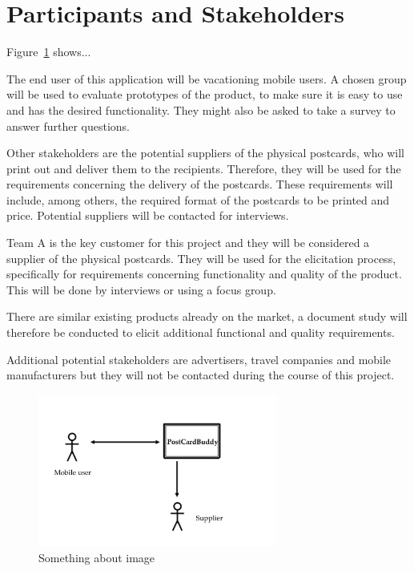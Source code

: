 \documentclass[10pt,a4paper]{article}
\begin{document}
\section{Participants and Stakeholders}
Figure~\ref{fig:stake} shows...

The end user of this application will be vacationing mobile users. A chosen group will be used to evaluate prototypes of the product, to make sure it is easy to use and has the desired functionality. They might also be asked to take a survey to answer further questions.

Other stakeholders are the potential suppliers of the physical postcards, who will print out and deliver them to the recipients. Therefore, they will be used for the requirements concerning the delivery of the postcards. These requirements will include, among others, the required format of the postcards to be printed and price. Potential suppliers will be contacted for interviews.

Team A is the key customer for this project and they will be considered a supplier of the physical postcards. They will be used for the elicitation process, specifically for requirements concerning functionality and quality of the product. This will be done by interviews or using a focus group. 

There are similar existing products already on the market, a document study will therefore be conducted to elicit additional functional and quality requirements. 

Additional potential stakeholders are advertisers, travel companies and mobile manufacturers but they will not be contacted during the course of this project.

\begin{figure}[h!]
\centering
\includegraphics[width=0.7\textwidth]{im.jpg}
\caption{Something about image}
\label{fig:stake}
\end{figure}
\end{document}
